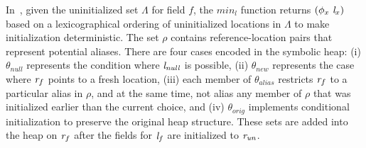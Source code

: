 In~, given the uninitialized set $\Lambda$ for
field $f$, the $\mathit{min}_l$ function returns
$(\phi_x\ \cfgnt{l}_x)$ based on a lexicographical ordering of
uninitialized locations in $\Lambda$ to make initialization
deterministic.  The set $\rho$ contains reference-location pairs that
represent potential aliases. There are four cases encoded in the
symbolic heap: (i) $\theta_\mathit{null}$ represents the condition
where $\emph{l}_\mathit{null}$ is possible, (ii)
$\theta_\mathit{new}$ represents the case where $\emph{r}_f$ points
to a fresh location, (iii) each member of $\theta_\mathit{alias}$
restricts $\emph{r}_f$ to a particular alias in $\rho$, and at the
same time, not alias any member of $\rho$ that was initialized earlier
than the current choice, and (iv) $\theta_\mathit{orig}$ implements
conditional initialization to preserve the original heap structure.
These sets are added into the heap on $\emph{r}_f$ after the fields
for $\emph{l}_f$ are initialized to $\emph{r}_\mathit{un}$.

